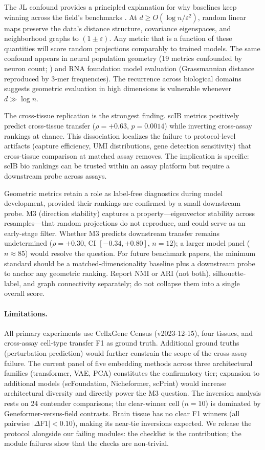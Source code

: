 \documentclass[11pt]{article}
\begin{document}
The JL confound provides a principled explanation for why baselines keep winning across the field's benchmarks \citep{johnsonlindenstrauss1984}. At $d \geq O(\log n / \varepsilon^2)$, random linear maps preserve the data's distance structure, covariance eigenspaces, and neighborhood graphs to $(1 \pm \varepsilon)$. Any metric that is a function of these quantities will score random projections comparably to trained models. The same confound appears in neural population geometry (19 metrics confounded by neuron count; \citealp{tower2026bracket}) and RNA foundation model evaluation (Grassmannian distance reproduced by 3-mer frequencies). The recurrence across biological domains suggests geometric evaluation in high dimensions is vulnerable whenever $d \gg \log n$.

The cross-tissue replication is the strongest finding. scIB metrics positively predict cross-tissue transfer ($\rho = +0.63$, $p = 0.0014$) while inverting cross-assay rankings at chance. This dissociation localizes the failure to protocol-level artifacts (capture efficiency, UMI distributions, gene detection sensitivity) that cross-tissue comparison at matched assay removes. The implication is specific: scIB bio rankings can be trusted within an assay platform but require a downstream probe across assays.

Geometric metrics retain a role as label-free diagnostics during model development, provided their rankings are confirmed by a small downstream probe. M3 (direction stability) captures a property---eigenvector stability across resamples---that random projections do not reproduce, and could serve as an early-stage filter. Whether M3 predicts downstream transfer remains undetermined ($\rho = +0.30$, CI $[-0.34, +0.80]$, $n = 12$); a larger model panel ($n \approx 85$) would resolve the question. For future benchmark papers, the minimum standard should be a matched-dimensionality baseline plus a downstream probe to anchor any geometric ranking. Report NMI or ARI (not both), silhouette-label, and graph connectivity separately; do not collapse them into a single overall score.

\paragraph{Limitations.} All primary experiments use CellxGene Census (v2023-12-15), four tissues, and cross-assay cell-type transfer F1 as ground truth. Additional ground truths (perturbation prediction) would further constrain the scope of the cross-assay failure. The current panel of five embedding methods across three architectural families (transformer, VAE, PCA) constitutes the confirmatory tier; expansion to additional models (scFoundation, Nicheformer, scPrint) would increase architectural diversity and directly power the M3 question. The inversion analysis rests on 24 contender comparisons; the clear-winner cell ($n = 10$) is dominated by Geneformer-versus-field contrasts. Brain tissue has no clear F1 winners (all pairwise $|\Delta\text{F1}| < 0.10$), making its near-tie inversions expected. We release the protocol alongside our failing modules: the checklist is the contribution; the module failures show that the checks are non-trivial.
\end{document}
